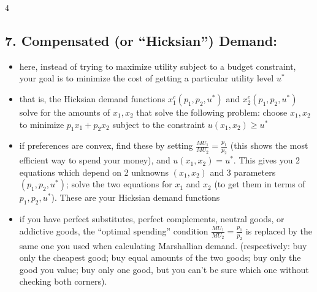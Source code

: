 \documentclass[8pt,landscape]{extarticle}
\begin{document}
\begin{multicols}{4}
\subsection*{7. Compensated (or ``Hicksian'') Demand:}
\begin{itemize}[leftmargin=*,noitemsep,topsep=0pt]
\item here, instead of trying to maximize utility subject to a budget constraint, your goal is to minimize the cost of getting a particular utility level $u^*$
\item that is, the Hicksian demand functions $x_1^c(p_1,p_2,u^*)$ and $x_2^c(p_1,p_2,u^*)$ solve for the amounts of $x_1,x_2$ that solve the following problem: choose $x_1,x_2$ to minimize $p_1 x_1 + p_2 x_2$ subject to the constraint $u(x_1,x_2) \geq u^*$
\item if preferences are convex, find these by setting $\frac{MU_1}{MU_2} = \frac{p_1}{p_2}$ (this shows the most efficient way to spend your money), and $u(x_1,x_2) = u^*$. This gives you 2 equations which depend on 2 unknowns $(x_1,x_2)$ and 3 parameters $(p_1,p_2,u^*)$; solve the two equations for $x_1$ and $x_2$ (to get them in terms of $p_1,p_2,u^*$). These are your Hicksian demand functions
\item if you have perfect substitutes, perfect complements, neutral goods, or addictive goods, the ``optimal spending'' condition $\frac{MU_1}{MU_2} = \frac{p_1}{p_2}$ is replaced by the same one you used when calculating Marshallian demand. (respectively: buy only the cheapest good; buy equal amounts of the two goods; buy only the good you value; buy only one good, but you can't be sure which one without checking both corners).
\end{itemize}


\end{multicols}
\end{document}
